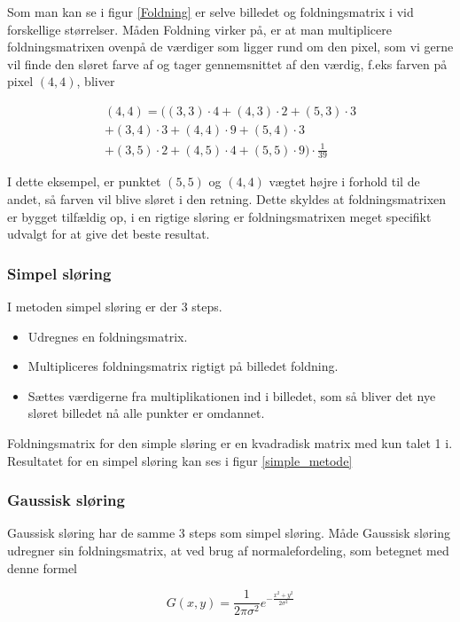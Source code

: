 {Som man kan se i figur \ref{Foldning} er selve billedet og foldningsmatrix i
vid forskellige størrelser. Måden Foldning virker på, er at man
multiplicere foldningsmatrixen ovenpå de værdiger som ligger rund om den pixel,
som vi gerne vil finde den sløret farve af og tager gennemsnittet af den
værdig, f.eks farven på pixel $(4,4)$, bliver

\begin{multline}
    (4,4) = ((3,3)\cdot 4+(4,3) \cdot 2+(5,3) \cdot 3\\
    + (3,4) \cdot 3+(4,4) \cdot 9+(5,4) \cdot 3\\
    + (3,5) \cdot 2+(4,5) \cdot 4+(5,5) \cdot 9) \cdot \frac{1}{39}
\end{multline}

I dette eksempel, er punktet $(5,5)$ og $(4,4)$ vægtet højre i forhold
til de andet, så farven vil blive sløret i den retning. Dette skyldes at
foldningsmatrixen er bygget tilfældig op, i en rigtige sløring er
foldningsmatrixen meget specifikt udvalgt for at give det beste
resultat.

\subsubsection*{Simpel sløring}
I metoden simpel sløring er der 3 steps.
\begin{itemize}
	\item{Udregnes en foldningsmatrix.}
	\item{Multipliceres foldningsmatrix rigtigt på billedet foldning.}
	\item{Sættes værdigerne fra multiplikationen ind i billedet, som så bliver det nye sløret billedet nå
alle punkter er omdannet.}
\end{itemize}

Foldningsmatrix for den simple sløring er en kvadradisk matrix med kun
talet 1 i. Resultatet for en simpel sløring kan ses i figur
\ref{simple_metode}

\subsubsection*{Gaussisk sløring}
Gaussisk sløring har de samme 3 steps som simpel sløring. Måde Gaussisk
sløring udregner sin foldningsmatrix, at ved brug af normalefordeling,
som betegnet med denne formel

\begin{equation}
	G(x,y) = \frac{1}{2\pi\sigma^2}e^{-\frac{x^2+y^2}{2\sigma^2}}
\end{equation}

}
